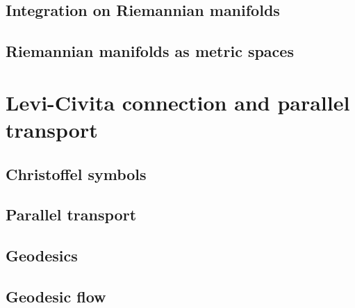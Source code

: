 \documentclass[letter-paper]{tufte-book}
\begin{document}

\section{Integration on Riemannian manifolds}


\section{Riemannian manifolds as metric spaces}


\chapter{Levi-Civita connection and parallel transport}


\section{Christoffel symbols}


\section{Parallel transport}


\section{Geodesics}


\section{Geodesic flow}

\end{document}
